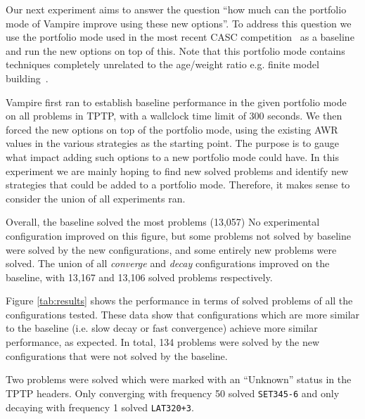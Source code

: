 \documentclass{llncs}
\begin{document}
Our next experiment aims to answer the question ``how much can the portfolio mode of Vampire improve using these new options''. To address this question we use the portfolio mode used in the most recent CASC competition~\cite{CADE18} as a baseline and run the new options on top of this. Note that this portfolio mode contains techniques completely unrelated to the age/weight ratio e.g. finite model building~\cite{DBLP:conf/sat/Reger0V16}. 

Vampire first ran to establish baseline performance in the given portfolio mode on all problems in TPTP, with a wallclock time limit of 300 seconds. We then forced the new options on top of the portfolio mode, using the existing AWR values in the various strategies as the starting point. The purpose is to gauge what impact adding such options to a new portfolio mode could have. In this experiment we are mainly hoping to find new solved problems and identify new strategies that could be added to a portfolio mode. Therefore, it makes sense to consider the union of all experiments ran.

Overall, the baseline solved the most problems (13,057)
No experimental configuration improved on this figure, but some problems not solved by baseline were solved by the new configurations, and some entirely new problems were solved.
The union of all \emph{converge} and \emph{decay} configurations improved on the baseline, with 13,167 and 13,106 solved problems respectively.

Figure \ref{tab:results} shows the performance in terms of solved problems of all the configurations tested.
These data show that configurations which are more similar to the baseline (i.e. slow decay or fast convergence) achieve more similar performance, as expected.
In total, 134 problems were solved by the new configurations that were not solved by the baseline.


Two problems were solved which were marked with an ``Unknown'' status in the TPTP headers.
Only converging with frequency 50 solved \texttt{SET345-6} and only decaying with frequency 1 solved \texttt{LAT320+3}.

\end{document}
